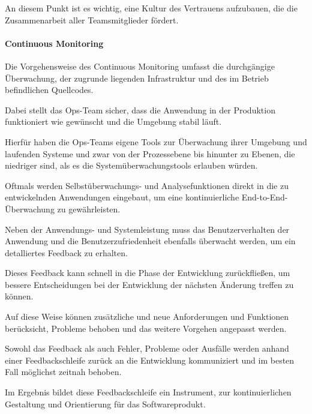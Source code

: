An diesem Punkt ist es wichtig, eine Kultur des Vertrauens aufzubauen, die die Zusammenarbeit aller Teamsmitglieder fördert. \cite{humble_why_2011} 

\paragraph{Continuous Monitoring}
Die Vorgehensweise des Continuous Monitoring umfasst die durchgängige Überwachung, der zugrunde liegenden Infrastruktur und des im Betrieb befindlichen Quellcodes. \cite{van_hoorn_continuous_2012} 

Dabei stellt das Ops-Team sicher, dass die Anwendung in der Produktion funktioniert wie gewünscht und die Umgebung stabil läuft. 

Hierfür haben die Ops-Teams eigene Tools zur Überwachung ihrer Umgebung und laufenden Systeme und zwar von der Prozessebene bis hinunter zu Ebenen, die niedriger sind, als es die Systemüberwachungstools erlauben würden. \cite[S. 26]{sharma_devops_2017}

Oftmals werden Selbstüberwachungs- und Analysefunktionen direkt in die zu entwickelnden Anwendungen eingebaut, um eine kontinuierliche End-to-End-Überwachung zu gewährleisten. \cite[S. 26]{sharma_devops_2017}

Neben der Anwendungs- und Systemleistung muss das Benutzerverhalten der Anwendung und die Benutzerzufriedenheit ebenfalls überwacht werden, um ein detalliertes Feedback zu erhalten. \cite[S. 112 - 113]{erder_continuous_2016}

Dieses Feedback kann schnell in die Phase der Entwicklung zurückfließen, um bessere Entscheidungen bei der Entwicklung der nächsten Änderung treffen zu können. 

Auf diese Weise können zusätzliche und neue Anforderungen und Funktionen berücksicht, Probleme behoben und das weitere Vorgehen angepasst werden. 

Sowohl das Feedback als auch Fehler, Probleme oder Ausfälle werden anhand einer Feedbackschleife zurück an die Entwicklung kommuniziert und im besten Fall möglichst zeitnah behoben. \cite[S. 112 - 113]{erder_continuous_2016} 

Im Ergebnis bildet diese Feedbackschleife ein Instrument, zur kontinuierlichen Gestaltung und Orientierung für das Softwareprodukt.   


